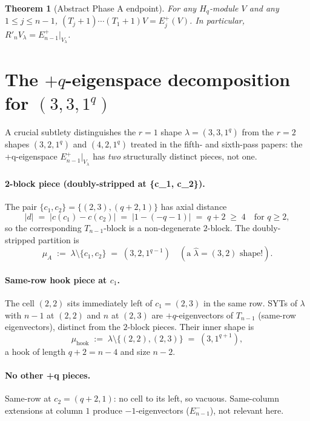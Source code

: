 \documentclass[11pt]{article}
\newtheorem{theorem}{Theorem}
\theoremstyle{definition}
\newcommand{\Hq}{H_q}
\newcommand{\hatl}{\widehat\lambda}
\begin{document}
\begin{theorem}[Abstract Phase A endpoint]\label{thm:phaseA}
For any $\Hq$-module $V$ and any $1 \le j \le n-1$,
$(T_j+1)\cdots(T_1+1) V = E_j^+(V)$.  In particular,
$R'_n V_\lambda = E_{n-1}^+|_{V_\lambda}$.
\end{theorem}

\section{The $+q$-eigenspace decomposition for $(3,3,1^q)$}\label{sec:Eplus}

A crucial subtlety distinguishes the $r = 1$ shape $\lambda = (3, 3, 1^q)$
from the $r = 2$ shapes $(3, 2, 1^q)$ and $(4, 2, 1^q)$ treated in the
fifth- and sixth-pass papers: the +q-eigenspace $E_{n-1}^+|_{V_\lambda}$
has \emph{two} structurally distinct pieces, not one.

\paragraph{2-block piece (doubly-stripped at \{c_1, c_2\}).}
The pair $\{c_1, c_2\} = \{(2, 3), (q+2, 1)\}$ has axial distance
\[
   |d| \;=\; |c(c_1) - c(c_2)| \;=\; |1 - (-q-1)| \;=\; q + 2 \;\ge\; 4
   \quad \text{for } q \ge 2,
\]
so the corresponding $T_{n-1}$-block is a non-degenerate $2$-block.
The doubly-stripped partition is
\[
   \mu_A \;:=\; \lambda \setminus \{c_1, c_2\} \;=\; (3, 2, 1^{q-1})
   \quad (\text{a $\hatl = (3, 2)$ shape!}).
\]

\paragraph{Same-row hook piece at $c_1$.}
The cell $(2, 2)$ sits immediately left of $c_1 = (2, 3)$ in the
same row.  SYTs of $\lambda$ with $n-1$ at $(2, 2)$ and $n$ at $(2, 3)$
are $+q$-eigenvectors of $T_{n-1}$ (same-row eigenvectors), distinct
from the $2$-block pieces.  Their inner shape is
\[
   \mu_{\mathrm{hook}} \;:=\; \lambda \setminus \{(2, 2), (2, 3)\}
   \;=\; (3, 1^{q+1}),
\]
a hook of length $q + 2 = n - 4$ and size $n - 2$.

\paragraph{No other +q pieces.}
Same-row at $c_2 = (q+2, 1)$: no cell to its left, so vacuous.
Same-column extensions at column $1$ produce $-1$-eigenvectors
($E_{n-1}^-$), not relevant here.
\end{document}
